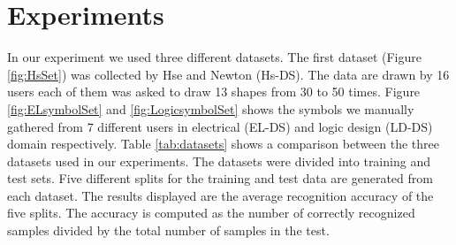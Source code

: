 \documentclass[preprint,1p,times,review]{elsarticle}
\begin{document}
\section{Experiments}
\label{sec:Experiments}

In our experiment we used three different datasets. The first dataset (Figure \ref{fig:HsSet}) was collected by Hse and Newton\cite{HeloiseBeautification} (Hs-DS). The data are drawn by 16 users each of them was asked to draw 13 shapes from 30 to 50 times. Figure \ref{fig:ELsymbolSet} and \ref{fig:LogicsymbolSet} shows the symbols we manually gathered from 7 different users in electrical (EL-DS) and logic design (LD-DS) domain respectively.  Table \ref{tab:datasets} shows a comparison between the three datasets used in our experiments. The datasets were divided into training and test sets. Five different splits for the training and test data are generated from each dataset. The results displayed are the average recognition accuracy of the five splits. The accuracy is computed as the number of correctly recognized samples divided by the total number of samples in the test.
\end{document}
